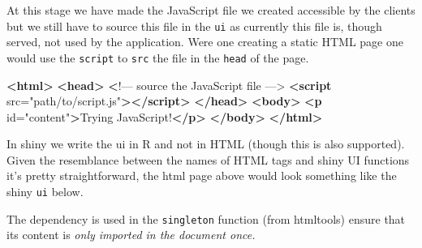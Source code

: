\documentclass[
]{krantz}
\makeatletter
\newenvironment{Shaded}{\begin{snugshade}}{\end{snugshade}}
\newcommand{\DataTypeTok}[1]{\textcolor[rgb]{0.27,0.27,0.27}{#1}}
\newcommand{\ErrorTok}[1]{\textcolor[rgb]{0.14,0.14,0.14}{\textbf{#1}}}
\newcommand{\KeywordTok}[1]{\textcolor[rgb]{0.27,0.27,0.27}{\textbf{#1}}}
\newcommand{\NormalTok}[1]{#1}
\newcommand{\OperatorTok}[1]{\textcolor[rgb]{0.43,0.43,0.43}{\textbf{#1}}}
\newcommand{\OtherTok}[1]{\textcolor[rgb]{0.37,0.37,0.37}{#1}}
\newcommand{\StringTok}[1]{\textcolor[rgb]{0.5,0.5,0.5}{#1}}
\newenvironment{kframe}{%
\medskip{}
\setlength{\fboxsep}{.8em}
 \def\at@end@of@kframe{}%
 \ifinner\ifhmode%
  \def\at@end@of@kframe{\end{minipage}}%
  \begin{minipage}{\columnwidth}%
 \fi\fi%
 \def\FrameCommand##1{\hskip\@totalleftmargin \hskip-\fboxsep
 \colorbox{shadecolor}{##1}\hskip-\fboxsep
     \hskip-\linewidth \hskip-\@totalleftmargin \hskip\columnwidth}%
 \MakeFramed {\advance\hsize-\width
   \@totalleftmargin\z@ \linewidth\hsize
   \@setminipage}}%
 {\par\unskip\endMakeFramed%
 \at@end@of@kframe}
\renewenvironment{Shaded}{\begin{kframe}}{\end{kframe}}
\makeatother
\begin{document}
At this stage we have made the JavaScript file we created accessible by the clients but we still have to source this file in the \texttt{ui} as currently this file is, though served, not used by the application. Were one creating a static HTML page one would use the \texttt{script} to \texttt{src} the file in the \texttt{head} of the page.

\begin{Shaded}
\begin{Highlighting}[]
\KeywordTok{\textless{}html\textgreater{}}
  \KeywordTok{\textless{}head\textgreater{}}
    \ErrorTok{\textless{}}\NormalTok{!–– source the JavaScript file ––\textgreater{}}
    \KeywordTok{\textless{}script}\OtherTok{ src=}\StringTok{"path/to/script.js"}\KeywordTok{\textgreater{}\textless{}/script\textgreater{}}
  \KeywordTok{\textless{}/head\textgreater{}}
  \KeywordTok{\textless{}body\textgreater{}}
    \KeywordTok{\textless{}p}\OtherTok{ id=}\StringTok{"content"}\KeywordTok{\textgreater{}}\NormalTok{Trying JavaScript!}\KeywordTok{\textless{}/p\textgreater{}}
  \KeywordTok{\textless{}/body\textgreater{}}
\KeywordTok{\textless{}/html\textgreater{}}
\end{Highlighting}
\end{Shaded}

In shiny we write the ui in R and not in HTML (though this is also supported). Given the resemblance between the names of HTML tags and shiny UI functions it's pretty straightforward, the html page above would look something like the shiny \texttt{ui} below.

\begin{Shaded}
\end{Shaded}

The dependency is used in the \texttt{singleton} function (from htmltools) ensure that its content is \emph{only imported in the document once.}
\end{document}
